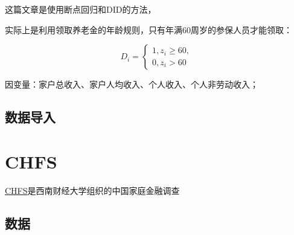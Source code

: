 \documentclass[
]{book}
\begin{document}
这篇文章是使用断点回归和DID的方法，

实际上是利用领取养老金的年龄规则，只有年满60周岁的参保人员才能领取：

\[D_i= \begin{cases}1,z_i\ge 60,\\0,z_i>60\end{cases}\]

因变量：家户总收入、家户人均收入、个人收入、个人非劳动收入；

\hypertarget{ux6570ux636eux5bfcux5165-1}{%
\section{数据导入}\label{ux6570ux636eux5bfcux5165-1}}

\hypertarget{chfs}{%
\chapter{CHFS}\label{chfs}}

\href{https://chfs.swufe.edu.cn/}{CHFS}是西南财经大学组织的中国家庭金融调查

\hypertarget{ux6570ux636e}{%
\section{数据}\label{ux6570ux636e}}

  
\end{document}
